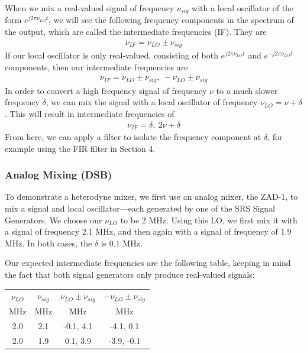 \documentclass[12pt]{article}
\begin{document}
When we mix a real-valued signal of frequency $\nu_{sig}$ with a local oscillator of the form $e^{j 2\pi \nu_{LO} t}$, we will see the following frequency components in the spectrum of the output, which are called the intermediate frequencies (IF). They are
\begin{eqnarray}
\nu_{IF} = \nu_{LO} \pm \nu_{sig}
\end{eqnarray}
If our local oscillator is only real-valued, consisting of both $e^{j 2\pi \nu_{LO} t}$ and $e^{-j 2\pi \nu_{LO} t}$ components, then our intermediate frequencies are
\begin{eqnarray}
\nu_{IF} = \nu_{LO} \pm \nu_{sig},\ -\nu_{LO} \pm \nu_{sig}
\end{eqnarray}
In order to convert a high frequency signal of frequency $\nu$ to a much slower frequency $\delta$, we can mix the signal with a local oscillator of frequency $\nu_{LO} = \nu + \delta$. This will result in intermediate frequencies of 
\begin{eqnarray}
\nu_{IF} = \delta,\ 2\nu + \delta \label{eq:bands}
\end{eqnarray}
From here, we can apply a filter to isolate the frequency component at $\delta$, for example using the FIR filter in Section 4.

\subsubsection{Analog Mixing (DSB)}
To demonstrate a heterodyne mixer, we first use an analog mixer, the ZAD-1, to mix a signal and local oscillator---each generated by one of the SRS Signal Generators. We choose our $\nu_{LO}$ to be $2$ MHz. Using this LO, we first mix it with a signal of frequency $2.1$ MHz, and then again with a signal of frequency of $1.9$ MHz. In both cases, the $\delta$ is $0.1$ MHz. 

Our expected intermediate frequencies are the following table, keeping in mind the fact that both signal generators only produce real-valued signals:

\begin{center}
  \begin{tabular}{c | c | c | c }
    $\nu_{LO}$ & $\nu_{sig}$ & $\nu_{LO} \pm \nu_{sig}$ & $-\nu_{LO} \pm \nu_{sig}$ \\
    MHz & MHz & MHz & MHz \\ \hline
    2.0 & 2.1 & -0.1, 4.1 & -4.1, 0.1 \\
    2.0 & 1.9 & 0.1, 3.9 & -3.9, -0.1 \\
  \end{tabular}\\
\end{center}
\end{document}
